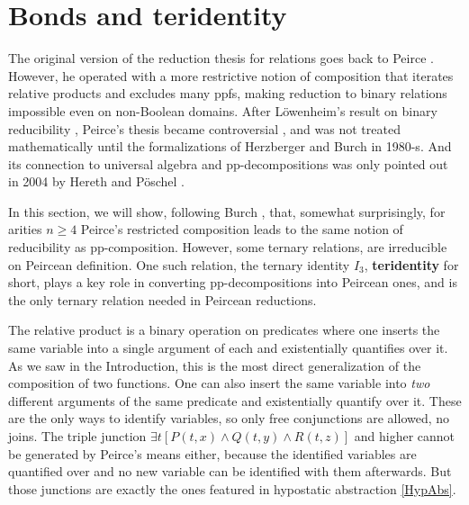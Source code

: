 \documentclass[11pt]{article}
\theoremstyle{plain}
\theoremstyle{definition}
\begin{document}
\section{Bonds and teridentity}\label{TerId}

The original version of the reduction thesis for relations goes back to Peirce \cite{Bur97,Kosh22}. However, he operated with a more restrictive notion of composition that iterates relative products and excludes many ppfs, making reduction to binary relations impossible even on non-Boolean domains. After L\"owenheim's result on binary reducibility \cite{Low}, Peirce's thesis became controversial \cite{Kosh22}, and was not treated mathematically until the formalizations of Herzberger \cite{Herz} and Burch \cite{Bur91} in 1980-s. And its connection to universal algebra and pp-decompositions was only pointed out in 2004 by Hereth and P\"oschel \cite{HerPos04}. 

In this section, we will show, following Burch \cite{Bur91,Bur97}, that, somewhat surprisingly, for arities $n\geq4$ Peirce's restricted composition leads to the same notion of reducibility as pp-composition. However, some ternary relations, are irreducible on Peircean definition. One such relation, the ternary identity $I_3$, {\bf teridentity} for short, plays a key role in converting pp-decompositions into Peircean ones, and is the only ternary relation needed in Peircean reductions.

The relative product is a binary operation on predicates where one inserts the same variable into a single argument of each and existentially quantifies over it. As we saw in the Introduction, this is the most direct generalization of the composition of two functions. One can also insert the same variable into {\it two} different arguments of the same predicate and existentially quantify over it. These are the only ways to identify variables, so only free conjunctions are allowed, no joins. The triple junction $\exists t\left[P(t,x)\land Q(t,y)\land R(t,z)\right]$ and higher cannot be generated by Peirce's means either, because the identified variables are quantified over and no new variable can be identified with them afterwards. But those junctions are exactly the ones featured in hypostatic abstraction \eqref{HypAbs}.
\end{document}
